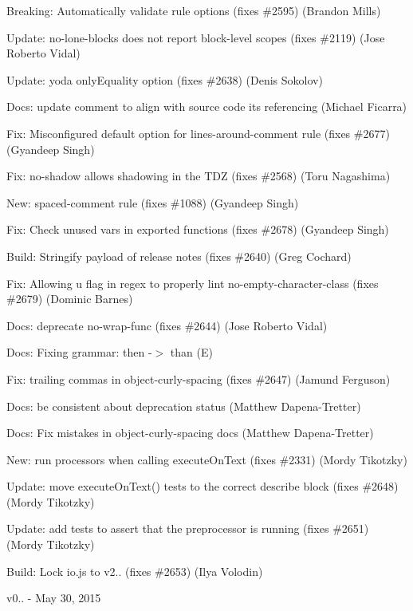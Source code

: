\begin{DoxyItemize}
\item Breaking\+: Automatically validate rule options (fixes \#2595) (Brandon Mills)
\item Update\+: no-\/lone-\/blocks does not report block-\/level scopes (fixes \#2119) (Jose Roberto Vidal)
\item Update\+: yoda only\+Equality option (fixes \#2638) (Denis Sokolov)
\item Docs\+: update comment to align with source code it\textquotesingle{}s referencing (Michael Ficarra)
\item Fix\+: Misconfigured default option for lines-\/around-\/comment rule (fixes \#2677) (Gyandeep Singh)
\item Fix\+: {\ttfamily no-\/shadow} allows shadowing in the T\+DZ (fixes \#2568) (Toru Nagashima)
\item New\+: spaced-\/comment rule (fixes \#1088) (Gyandeep Singh)
\item Fix\+: Check unused vars in exported functions (fixes \#2678) (Gyandeep Singh)
\item Build\+: Stringify payload of release notes (fixes \#2640) (Greg Cochard)
\item Fix\+: Allowing u flag in regex to properly lint no-\/empty-\/character-\/class (fixes \#2679) (Dominic Barnes)
\item Docs\+: deprecate no-\/wrap-\/func (fixes \#2644) (Jose Roberto Vidal)
\item Docs\+: Fixing grammar\+: then -\/$>$ than (E)
\item Fix\+: trailing commas in object-\/curly-\/spacing (fixes \#2647) (Jamund Ferguson)
\item Docs\+: be consistent about deprecation status (Matthew Dapena-\/\+Tretter)
\item Docs\+: Fix mistakes in object-\/curly-\/spacing docs (Matthew Dapena-\/\+Tretter)
\item New\+: run processors when calling execute\+On\+Text (fixes \#2331) (Mordy Tikotzky)
\item Update\+: move execute\+On\+Text() tests to the correct describe block (fixes \#2648) (Mordy Tikotzky)
\item Update\+: add tests to assert that the preprocessor is running (fixes \#2651) (Mordy Tikotzky)
\item Build\+: Lock io.\+js to v2.. (fixes \#2653) (Ilya Volodin)
\end{DoxyItemize}

v0.. -\/ May 30, 2015


